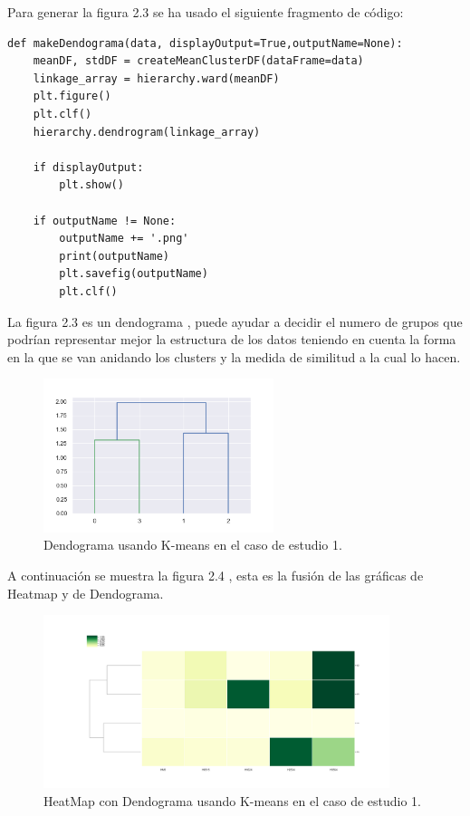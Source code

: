 	Para generar la figura 2.3 se ha usado el siguiente fragmento de código: \\

	\lstset{language=python}
	\begin{lstlisting}[frame=single]
def makeDendograma(data, displayOutput=True,outputName=None):
	meanDF, stdDF = createMeanClusterDF(dataFrame=data)   
	linkage_array = hierarchy.ward(meanDF)
	plt.figure()
	plt.clf()
	hierarchy.dendrogram(linkage_array)
	
	if displayOutput:
		plt.show()

	if outputName != None:
		outputName += '.png'
		print(outputName)
		plt.savefig(outputName)
		plt.clf()	
	\end{lstlisting}

	La figura 2.3 es un dendograma , puede ayudar a decidir el numero de grupos que podrían representar
	mejor la estructura de los datos teniendo en cuenta la forma en la que se van anidando los clusters
	y la medida de similitud a la cual lo hacen. \\

	\begin{figure}[htb]
		\centering
		\includegraphics[width=0.6\textwidth]{./imagenes/caso1/dendograma_caso1_K-means}
		\caption{Dendograma usando K-means en el caso de estudio 1.} \label{fig:1}
	\end{figure}

	A continuación se muestra la figura 2.4 , esta es la fusión de las gráficas de 
	Heatmap y de Dendograma.  \\

	\begin{figure}[htb]
		\centering
		\includegraphics[width=0.9\textwidth]{./imagenes/caso1/heatmapcondendograma_caso1_K-means}
		\caption{HeatMap con Dendograma usando K-means en el caso de estudio 1.} \label{fig:1}
	\end{figure}

